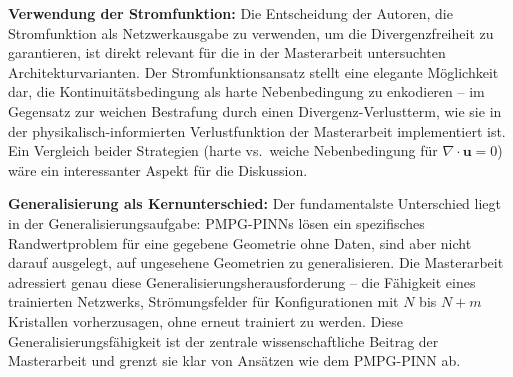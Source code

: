 \documentclass[a4paper,12pt]{article}
\begin{document}
\textbf{Verwendung der Stromfunktion:} Die Entscheidung der Autoren, die Stromfunktion als Netzwerkausgabe zu verwenden, um die Divergenzfreiheit zu garantieren, ist direkt relevant für die in der Masterarbeit untersuchten Architekturvarianten. Der Stromfunktionsansatz stellt eine elegante Möglichkeit dar, die Kontinuitätsbedingung als harte Nebenbedingung zu enkodieren – im Gegensatz zur weichen Bestrafung durch einen Divergenz-Verlustterm, wie sie in der physikalisch-informierten Verlustfunktion der Masterarbeit implementiert ist. Ein Vergleich beider Strategien (harte vs.\ weiche Nebenbedingung für $\nabla \cdot \mathbf{u} = 0$) wäre ein interessanter Aspekt für die Diskussion.

\textbf{Generalisierung als Kernunterschied:} Der fundamentalste Unterschied liegt in der Generalisierungsaufgabe: PMPG-PINNs lösen ein spezifisches Randwertproblem für eine gegebene Geometrie ohne Daten, sind aber nicht darauf ausgelegt, auf ungesehene Geometrien zu generalisieren. Die Masterarbeit adressiert genau diese Generalisierungsherausforderung – die Fähigkeit eines trainierten Netzwerks, Strömungsfelder für Konfigurationen mit $N$ bis $N+m$ Kristallen vorherzusagen, ohne erneut trainiert zu werden. Diese Generalisierungsfähigkeit ist der zentrale wissenschaftliche Beitrag der Masterarbeit und grenzt sie klar von Ansätzen wie dem PMPG-PINN ab.
\end{document}
